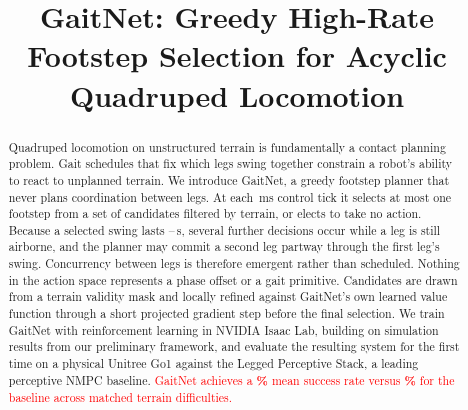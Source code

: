 \documentclass[conference]{IEEEtran}
\newcommand{\pending}[1]{\textcolor{red}{#1}}
\begin{document}
\title{GaitNet: Greedy High-Rate Footstep Selection for Acyclic
  Quadruped Locomotion}

\author{
  \and
  \and
}

\maketitle

\begin{abstract}
  Quadruped locomotion on unstructured terrain is fundamentally a
  contact planning problem. Gait schedules that fix which legs swing
  together constrain a robot's ability to react to unplanned terrain.
  We introduce GaitNet, a greedy footstep planner that never plans
  coordination between legs. At each \corlControlTickMs\,ms control
  tick it selects at most one footstep from a set of candidates
  filtered by terrain, or elects to take no action. Because a selected
  swing lasts \corlSwingDurationMin--\corlSwingDurationMax\,s, several
  further decisions occur while a leg is still airborne, and the
  planner may commit a second leg partway through the first leg's
  swing. Concurrency between legs is therefore emergent rather than
  scheduled. Nothing in the action space represents a phase offset or
  a gait primitive. Candidates are drawn from a terrain validity mask
  and locally refined against GaitNet's own learned value function
  through a short projected gradient step before the final selection.
  We train GaitNet with reinforcement learning in NVIDIA Isaac Lab,
  building on simulation results from our preliminary framework, and
  evaluate the resulting system for the first time on a physical
  Unitree Go1 against the Legged Perceptive Stack, a leading
  perceptive NMPC baseline. \pending{GaitNet achieves a
  \textbf{\corlHwFullSuccess\%} mean success rate versus
  \textbf{\corlHwLPSSuccess\%} for the baseline across matched terrain
  difficulties.}
\end{abstract}
\end{document}
